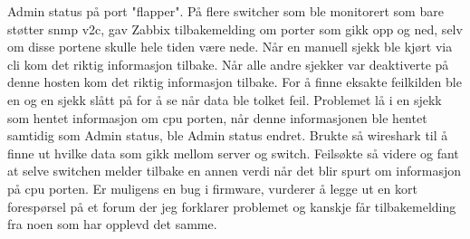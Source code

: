Admin status på port "flapper".
På flere switcher som ble monitorert som bare støtter \gls{snmp} v2c, gav Zabbix tilbakemelding om porter som gikk opp og ned, selv om disse portene skulle hele tiden være nede. Når en manuell sjekk ble kjørt via \gls{cli} kom det riktig informasjon tilbake. Når alle andre sjekker var deaktiverte på denne hosten kom det riktig informasjon tilbake.
For å finne eksakte feilkilden ble en og en sjekk slått på for å se når data ble tolket feil.
Problemet lå i en sjekk som hentet informasjon om \gls{cpu} porten, når denne informasjonen ble hentet samtidig som Admin status, ble Admin status endret.
Brukte så wireshark til å finne ut hvilke data som gikk mellom server og switch. Feilsøkte så videre og fant at selve switchen melder tilbake en annen verdi når det blir spurt om informasjon på \gls{cpu} porten. Er muligens en bug i firmware, vurderer å legge ut en kort forespørsel på et forum der jeg forklarer problemet og kanskje får tilbakemelding fra noen som har opplevd det samme.

